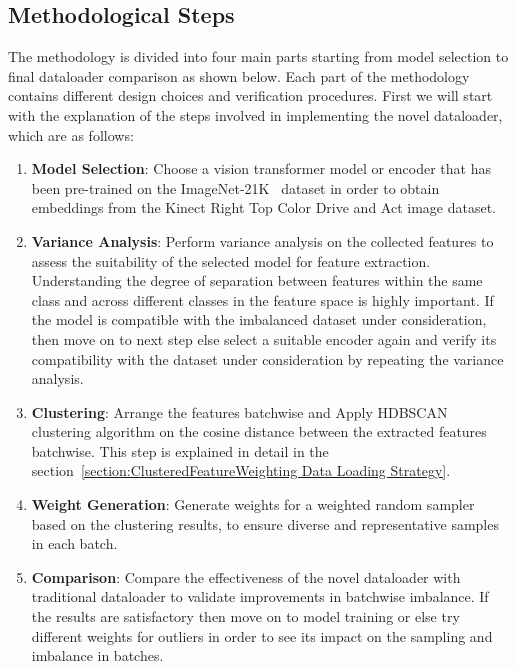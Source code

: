 \subsection{Methodological Steps}
The methodology is divided into four main parts starting from model selection to final dataloader comparison as shown below. Each part of the methodology contains different design choices and verification procedures. First we will start with the explanation of the steps involved in implementing the novel dataloader, which are as follows:

\begin{enumerate}
    \item \textbf{Model Selection}: Choose a vision transformer model or encoder that has been pre-trained on the ImageNet-21K~\citep{Imagenet1k_ILSVRC15} dataset in order to obtain embeddings from the Kinect Right Top Color Drive and Act image dataset.
    
    \item \textbf{Variance Analysis}: Perform variance analysis on the collected features to assess the suitability of the selected model for feature extraction. Understanding the degree of separation between features within the same class and across different classes in the feature space is highly important. If the model is compatible with the imbalanced dataset under consideration, then move on to next step else select a suitable encoder again and verify its compatibility with the dataset under consideration by repeating the variance analysis. 
    \item \textbf{Clustering}: Arrange the features batchwise and Apply HDBSCAN~\citep{HDBSCAN_algo_campello2013density} clustering algorithm on the cosine distance between the extracted features batchwise. This step is explained in detail in the section~\ref{section:ClusteredFeatureWeighting Data Loading Strategy}.
    \item \textbf{Weight Generation}: Generate weights for a weighted random sampler based on the clustering results, to ensure diverse and representative samples in each batch.
    \item \textbf{Comparison}: Compare the effectiveness of the novel dataloader with traditional dataloader to validate improvements in batchwise imbalance. If the results are satisfactory then move on to model training or else try different weights for outliers in order to see its impact on the sampling and imbalance in batches.
\end{enumerate}

